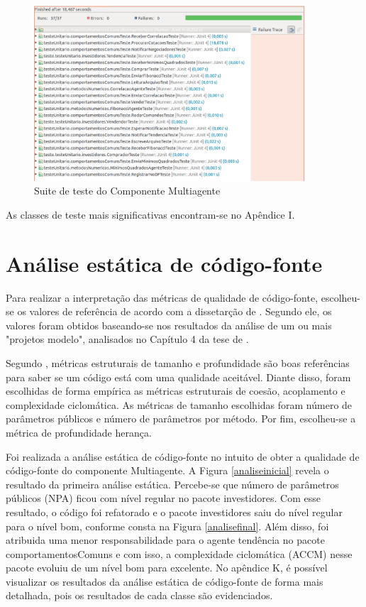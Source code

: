 \begin{figure}[H]
\centering
\includegraphics[width=0.9\textwidth]{figuras/eclemmaTodasClasses}
\caption{Suite de teste do Componente Multiagente}
\label{eclemmaTodasClasses}
\end{figure}

As classes de teste mais significativas encontram-se no Apêndice I.

\section{Análise estática de código-fonte}
Para realizar a interpretação das métricas de qualidade de código-fonte, escolheu-se os valores de referência de acordo com a dissetarção de \cite{filho}. Segundo ele, os valores foram obtidos baseando-se nos resultados da análise de um ou mais "projetos
modelo", analisados no Capítulo 4 da tese de \cite{meirelles2013}.

Segundo \cite{braga2012}, métricas estruturais de tamanho e profundidade são boas referências para saber se um código está com uma qualidade aceitável. Diante disso, foram escolhidas de forma empírica as métricas estruturais de coesão, acoplamento e complexidade ciclomática. As métricas de tamanho escolhidas foram número de parâmetros públicos e número de parâmetros por método. Por fim, escolheu-se a métrica de profundidade herança.

Foi realizada a análise estática de código-fonte no intuito de obter a qualidade de código-fonte do componente Multiagente. A Figura \ref{analiseinicial} revela o resultado da primeira análise estática. Percebe-se que número de parâmetros públicos (NPA) ficou com nível regular no pacote investidores. Com esse resultado, o código foi refatorado e o pacote investidores saiu do nível regular para o nível bom, conforme consta na Figura \ref{analisefinal}. Além disso, foi atribuida uma menor responsabilidade para o agente tendência no pacote comportamentosComuns e com isso, a complexidade ciclomática (ACCM) nesse pacote evoluiu de um nível bom para excelente. No apêndice K, é possível visualizar os resultados da análise estática de código-fonte de forma mais detalhada, pois os resultados de cada classe são evidenciados.

